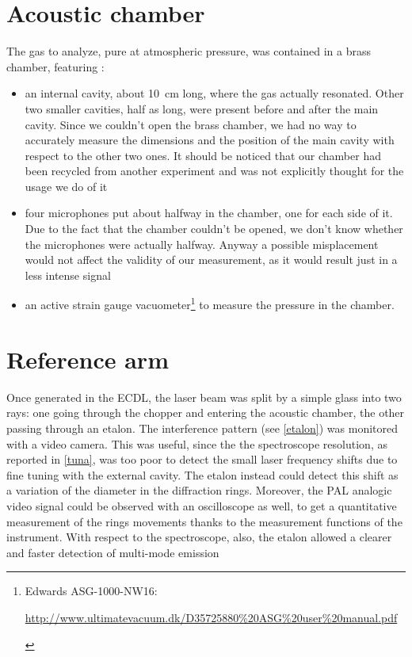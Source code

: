\section{Acoustic chamber} 
 The gas to analyze, pure  at atmospheric pressure, was contained in a brass chamber, featuring :
\begin{itemize}
	\item an internal cavity, about \mbox{10 cm} long, where the gas actually resonated. Other two smaller cavities, half as long, were present before and after the main cavity. Since we couldn't open the brass chamber, we had no way to accurately measure the dimensions and the position of the main cavity with respect to the other two ones. It should be noticed that our chamber had been recycled from another experiment and was not explicitly thought for the usage we do of it
	\item four microphones put about halfway in the chamber, one for each side of it. Due to the fact that the chamber couldn't be opened, we don't know whether the microphones were actually halfway. Anyway a possible misplacement would not affect the validity of our measurement, as it would result just in a less intense signal
	\item an active strain gauge vacuometer\footnote{Edwards ASG-1000-NW16:\vspace{-10pt}\begin{flushright}\url{http://www.ultimatevacuum.dk/D35725880\%20ASG\%20user\%20manual.pdf }\end{flushright}} to measure the pressure in the chamber. 
\end{itemize}

\section{Reference arm}\label{referencearm}
Once generated in the ECDL, the laser beam was split by a simple glass into two rays: one going through the chopper and entering the acoustic chamber, the other passing  through an etalon. The interference pattern (see \cref{etalon}) was monitored with a video camera. This was useful, since the the spectroscope resolution, as reported in \cref{tuna}, was too poor to detect the small laser frequency shifts due to fine tuning with the external cavity. The etalon instead could detect this shift as a variation of the diameter in the diffraction rings. Moreover, the PAL analogic video signal could be observed with an oscilloscope as well, to get a quantitative measurement of the rings movements thanks to the measurement functions of the instrument. With respect to the spectroscope, also, the etalon allowed a clearer and faster detection of multi-mode emission 